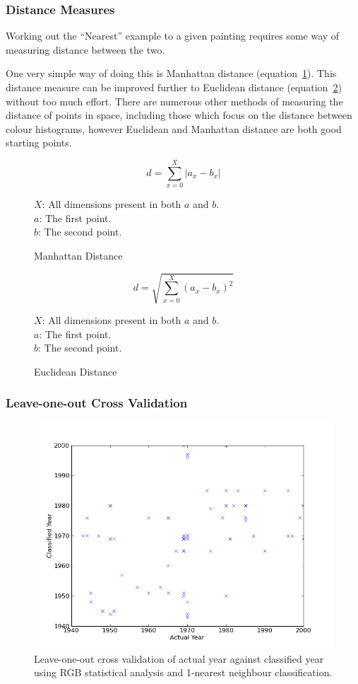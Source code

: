 \documentclass[11pt,fleqn,twoside]{article}
\begin{document}
\subsubsection{Distance Measures}
Working out the ``Nearest'' example to a given painting requires some way of measuring distance
between the two.

One very simple way of doing this is Manhattan distance (equation~\ref{eq:manhattan}). This distance
measure can be improved further to Euclidean distance (equation~\ref{eq:euclidean}) without too much
effort. There are numerous other methods of measuring the distance of points in space, including
those which focus on the distance between colour histograms, however Euclidean and Manhattan 
distance are both good starting points.

\begin{figure}[h]
\[
d = \sum^X_{x=0}{|a_x - b_x|}
\]

\(X\): All dimensions present in both \(a\) and \(b\).\\
\(a\): The first point.\\
\(b\): The second point.

\caption{Manhattan Distance}
\label{eq:manhattan}
\end{figure}

\begin{figure}[h]
\[
d = \sqrt{\sum^X_{x=0}{(a_x - b_x)^2}}
\]

\(X\): All dimensions present in both \(a\) and \(b\).\\
\(a\): The first point.\\
\(b\): The second point.
\caption{Euclidean Distance}
\label{eq:euclidean}
\end{figure}



\subsubsection{Leave-one-out Cross Validation}
\begin{figure}[h]
\includegraphics[scale=0.5]{img/validation-rgb-1nn.png}
\caption{Leave-one-out cross validation of actual year against classified year using RGB statistical analysis and
1-nearest neighbour classification.}
\label{fig:validation-rgb-1nn}
\end{figure}
\end{document}
